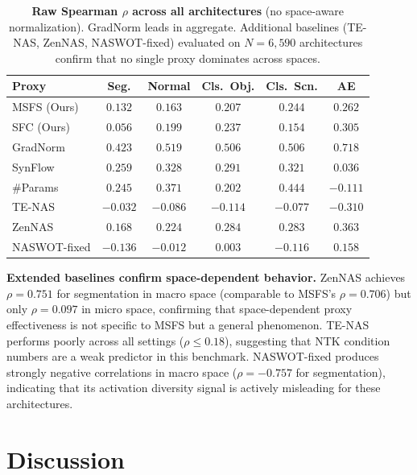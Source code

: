 \documentclass[10pt,twocolumn,letterpaper]{article}
\newcommand{\sfc}{\textsc{SFC}}
\newcommand{\msfs}{\textsc{MSFS}}
\begin{document}
\begin{table}[t]
\centering
\caption{\textbf{Raw Spearman $\rho$ across all architectures} (no space-aware normalization). GradNorm leads in aggregate. Additional baselines (TE-NAS, ZenNAS, NASWOT-fixed) evaluated on $N{=}6{,}590$ architectures confirm that no single proxy dominates across spaces.}
\label{tab:main_all}
\small
\setlength{\tabcolsep}{2.5pt}
\begin{tabular}{@{}lccccc@{}}
\toprule
Proxy & Seg. & Normal & Cls.\ Obj. & Cls.\ Scn. & AE \\
\midrule
\msfs{} (Ours) & $0.132$ & $0.163$ & $0.207$ & $0.244$ & $0.262$ \\
\sfc{} (Ours)  & $0.056$ & $0.199$ & $0.237$ & $0.154$ & $0.305$ \\
GradNorm       & $\mathbf{0.423}$ & $\mathbf{0.519}$ & $\mathbf{0.506}$ & $\mathbf{0.506}$ & $\mathbf{0.718}$ \\
SynFlow        & $0.259$ & $0.328$ & $0.291$ & $0.321$ & $0.036$ \\
\#Params       & $0.245$ & $0.371$ & $0.202$ & $0.444$ & $-0.111$ \\
\midrule
TE-NAS         & $-0.032$ & $-0.086$ & $-0.114$ & $-0.077$ & $-0.310$ \\
ZenNAS         & $0.168$ & $0.224$ & $0.284$ & $0.283$ & $0.363$ \\
NASWOT-fixed   & $-0.136$ & $-0.012$ & $0.003$ & $-0.116$ & $0.158$ \\
\bottomrule
\end{tabular}
\end{table}

\textbf{Extended baselines confirm space-dependent behavior.}
ZenNAS achieves $\rho{=}0.751$ for segmentation in macro space (comparable to MSFS's $\rho{=}0.706$) but only $\rho{=}0.097$ in micro space, confirming that space-dependent proxy effectiveness is not specific to MSFS but a general phenomenon.
TE-NAS performs poorly across all settings ($\rho{\leq}0.18$), suggesting that NTK condition numbers are a weak predictor in this benchmark.
NASWOT-fixed produces strongly negative correlations in macro space ($\rho{=}{-}0.757$ for segmentation), indicating that its activation diversity signal is actively misleading for these architectures.

\section{Discussion}
\end{document}

